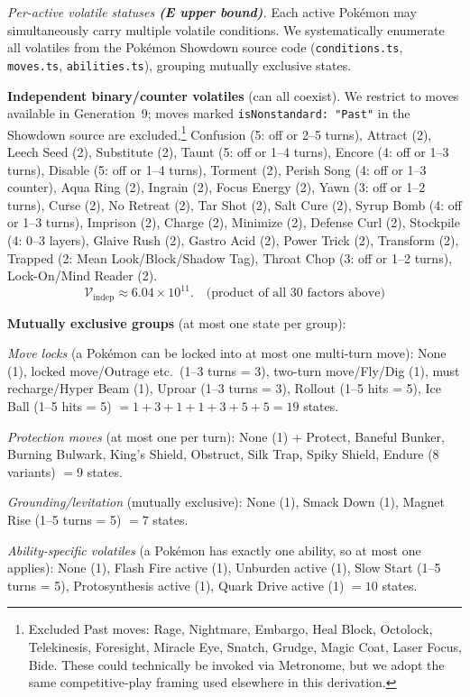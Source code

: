 \emph{Per-active volatile statuses \textbf{(E upper bound)}.}
Each active Pok\'emon may simultaneously carry multiple volatile conditions.
We systematically enumerate all volatiles from the Pok\'emon Showdown source code (\texttt{conditions.ts}, \texttt{moves.ts}, \texttt{abilities.ts}), grouping mutually exclusive states.

\textbf{Independent binary/counter volatiles} (can all coexist).
We restrict to moves available in Generation~9; moves marked \texttt{isNonstandard:\ "Past"} in the Showdown source are excluded.\footnote{Excluded Past moves: Rage, Nightmare, Embargo, Heal Block, Octolock, Telekinesis, Foresight, Miracle Eye, Snatch, Grudge, Magic Coat, Laser Focus, Bide. These could technically be invoked via Metronome, but we adopt the same competitive-play framing used elsewhere in this derivation.}
Confusion (5: off or 2--5 turns),
Attract (2),
Leech Seed (2),
Substitute (2),
Taunt (5: off or 1--4 turns),
Encore (4: off or 1--3 turns),
Disable (5: off or 1--4 turns),
Torment (2),
Perish Song (4: off or 1--3 counter),
Aqua Ring (2),
Ingrain (2),
Focus Energy (2),
Yawn (3: off or 1--2 turns),
Curse (2),
No Retreat (2),
Tar Shot (2),
Salt Cure (2),
Syrup Bomb (4: off or 1--3 turns),
Imprison (2),
Charge (2),
Minimize (2),
Defense Curl (2),
Stockpile (4: 0--3 layers),
Glaive Rush (2),
Gastro Acid (2),
Power Trick (2),
Transform (2),
Trapped (2: Mean Look/Block/Shadow Tag),
Throat Chop (3: off or 1--2 turns),
Lock-On/Mind Reader (2).
\begin{equation}
    \mathcal{V}_{\text{indep}} \approx 6.04 \times 10^{11}. \quad \text{(product of all 30 factors above)}
\end{equation}

\textbf{Mutually exclusive groups} (at most one state per group):

\emph{Move locks} (a Pok\'emon can be locked into at most one multi-turn move):
None (1), locked move/Outrage etc.\ (1--3 turns = 3), two-turn move/Fly/Dig (1), must recharge/Hyper Beam (1), Uproar (1--3 turns = 3), Rollout (1--5 hits = 5), Ice Ball (1--5 hits = 5) $= 1+3+1+1+3+5+5 = 19$ states.

\emph{Protection moves} (at most one per turn):
None (1) + Protect, Baneful Bunker, Burning Bulwark, King's Shield, Obstruct, Silk Trap, Spiky Shield, Endure (8 variants) $= 9$ states.

\emph{Grounding/levitation} (mutually exclusive):
None (1), Smack Down (1), Magnet Rise (1--5 turns = 5) $= 7$ states.

\emph{Ability-specific volatiles} (a Pok\'emon has exactly one ability, so at most one applies):
None (1), Flash Fire active (1), Unburden active (1), Slow Start (1--5 turns = 5), Protosynthesis active (1), Quark Drive active (1) $= 10$ states.

